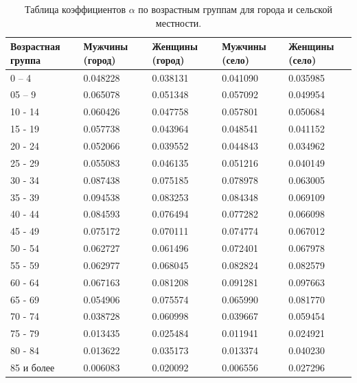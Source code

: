 \documentclass[14pt,a4paper]{article}
\begin{document}
\begin{table}[h!]
	\centering
	\setlength{\arrayrulewidth}{1pt}
	\renewcommand{\arraystretch}{1.5}
	\caption{Таблица коэффициентов $\alpha$ по возрастным группам для города и сельской местности.}
	\begin{tabularx}{\linewidth}{|X|X|X|X|X|}
		\hline
		{Возрастная группа} & 
		{Мужчины (город)} &
		{Женщины (город)} &
		{Мужчины (село)}   &
		{Женщины (село)} \\
		\hline
		0 – 4 & 0.048228 & 0.038131 & 0.041090 & 0.035985 \\ \hline
		05 – 9 & 0.065078 & 0.051348 & 0.057092 & 0.049954 \\ \hline
		10 - 14 & 0.060426 & 0.047758 & 0.057801 & 0.050684 \\ \hline
		15 - 19 & 0.057738 & 0.043964 & 0.048541 & 0.041152 \\ \hline
		20 - 24 & 0.052066 & 0.039552 & 0.044843 & 0.034962 \\ \hline
		25 - 29 & 0.055083 & 0.046135 & 0.051216 & 0.040149 \\ \hline
		30 - 34 & 0.087438 & 0.075185 & 0.078978 & 0.063005 \\ \hline
		35 - 39 & 0.094538 & 0.083253 & 0.084348 & 0.069109 \\ \hline
		40 - 44 & 0.084593 & 0.076494 & 0.077282 & 0.066098 \\ \hline
		45 - 49 & 0.075172 & 0.070111 & 0.074774 & 0.067012 \\ \hline
		50 - 54 & 0.062727 & 0.061496 & 0.072401 & 0.067978 \\ \hline
		55 - 59 & 0.062977 & 0.068045 & 0.082824 & 0.082579 \\ \hline
		60 - 64 & 0.067163 & 0.081208 & 0.091281 & 0.097663 \\ \hline
		65 - 69 & 0.054906 & 0.075574 & 0.065990 & 0.081770 \\ \hline
		70 - 74 & 0.038728 & 0.060998 & 0.039667 & 0.059454 \\ \hline
		75 - 79 & 0.013435 & 0.025484 & 0.011941 & 0.024921 \\ \hline
		80 - 84 & 0.013622 & 0.035173 & 0.013374 & 0.040230 \\ \hline
		85 и более & 0.006083 & 0.020092 & 0.006556 & 0.027296 \\
		\hline
	\end{tabularx}
	\label{coeff}
\end{table}


\end{document}
